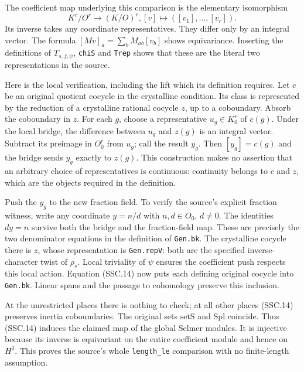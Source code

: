 The coefficient map underlying this comparison is the elementary
isomorphism
\[
 K^r/O^r\longrightarrow(K/O)^r,
       [v]\longmapsto([v_1],\ldots,[v_r]).                    \tag{SSC.14}
\]
Its inverse takes any coordinate representatives. They differ
only by an integral vector. The formula
$[Mv]_a=\sum_b M_{ab}[v_b]$ shows equivariance. Inserting the
definitions of $T_{s,f,\psi}$, \texttt{chiS} and \texttt{Trep}
shows that these are the literal two representations in the source.

Here is the local verification, including the lift which its
definition requires. Let $c$ be an original quotient cocycle in
the crystalline condition. Its class is represented by the
reduction of a crystalline rational cocycle $z$, up to a
coboundary. Absorb the coboundary in $z$. For each $g$, choose a
representative $u_g\in K_0^r$ of $c(g)$. Under the local bridge,
the difference between $u_g$ and $z(g)$ is an integral vector.
Subtract its preimage in $O_0^r$ from $u_g$; call the result $y_g$.
Then $[y_g]=c(g)$ and the bridge sends $y_g$ exactly to $z(g)$.
This construction makes no assertion that an arbitrary choice
of representatives is continuous: continuity belongs to $c$ and
$z$, which are the objects required in the definition.

Push the $y_g$ to the new fraction field. To verify the source's
explicit fraction witness, write any coordinate $y=n/d$ with
$n,d\in O_0$, $d\ne0$. The identities
$dy=n$ survive both the bridge and the fraction-field map. These
are precisely the two denominator equations in the definition of
\texttt{Gen.bk}. The crystalline cocycle there is $z$, whose
representation is \texttt{Gen.repV}: both are the specified
inverse-character twist of $\rho_s$. Local triviality of $\psi$
ensures the coefficient push respects this local action.
Equation (SSC.14) now puts each defining original cocycle into
\texttt{Gen.bk}. Linear spans and the passage to cohomology preserve
this inclusion.

At the unrestricted places there is nothing to check; at all other
places (SSC.14) preserves inertia coboundaries. The original sets
$\mathrm{setS}$ and $\mathrm{Spl}$ coincide. Thus (SSC.14) induces
the claimed map of the global Selmer modules. It is injective
because its inverse is equivariant on the entire coefficient module
and hence on $H^1$. This proves the source's whole
\texttt{length\_le} comparison with no finite-length assumption.

